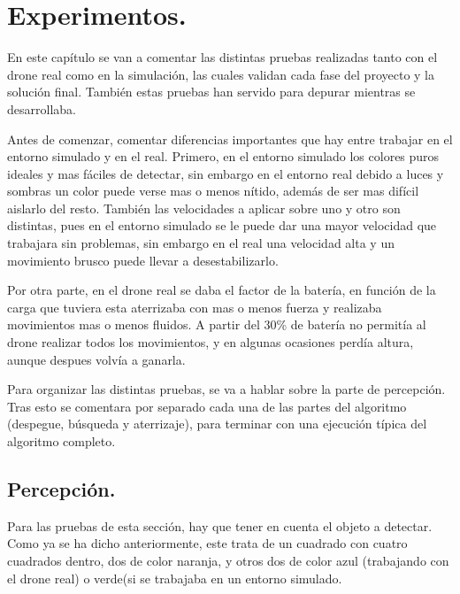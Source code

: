 \chapter{Experimentos.}\label{cap.experimentos}
\hspace{1cm} En este cap\'itulo se van a comentar las distintas pruebas realizadas tanto con el drone real como en la simulaci\'on, las cuales validan cada fase del proyecto y la soluci\'on final. Tambi\'en estas pruebas han servido para depurar mientras se desarrollaba. 

\hspace{1cm} Antes de comenzar, comentar diferencias importantes que hay entre trabajar en el entorno simulado y en el real. Primero, en el entorno simulado los colores puros ideales y mas f\'aciles de detectar, sin embargo en el entorno real debido a luces y sombras un color puede verse mas o menos n\'itido, adem\'as de ser mas dif\'icil aislarlo del resto. Tambi\'en las velocidades a aplicar sobre uno y otro son distintas, pues en el entorno simulado se le puede dar una mayor velocidad que trabajara sin problemas, sin embargo en el real una velocidad alta y un movimiento brusco puede llevar a desestabilizarlo. 

\hspace{1cm} Por otra parte, en el drone real se daba el factor de la bater\'ia, en funci\'on de la carga que tuviera esta aterrizaba con mas o menos fuerza y realizaba movimientos mas o menos fluidos. A partir del 30\% de bater\'ia no permit\'ia al drone realizar todos los movimientos, y en algunas ocasiones perd\'ia altura, aunque despues volv\'ia a ganarla. 

\hspace{1cm} Para organizar las distintas pruebas,  se va a hablar sobre la parte de percepci\'on. Tras esto se comentara por separado cada una de las partes del algoritmo (despegue, b\'usqueda y aterrizaje), para terminar con una ejecuci\'on t\'ipica del algoritmo completo.

\section{Percepci\'on. }

\hspace{1cm} Para las pruebas de esta secci\'on, hay que tener en cuenta el objeto a detectar. Como ya se ha dicho anteriormente, este trata de un cuadrado con cuatro cuadrados dentro, dos de color naranja, y otros dos de color azul (trabajando con el drone real) o verde(si se trabajaba en un entorno simulado. 

